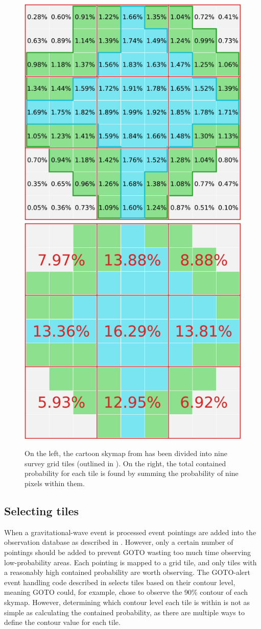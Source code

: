 \begin{colsection}
\begin{colsection}
\begin{figure}[t]
    \begin{center}
        \includegraphics[width=0.46\linewidth]{images/sim/sim_skymap_pix_probs.pdf}
        \includegraphics[width=0.46\linewidth]{images/sim/sim_skymap_tile_probs.pdf}
    \end{center}
    \caption[Mapping a 2D probability skymap onto grid tiles]{
        On the left, the cartoon skymap from  has been divided into nine survey grid tiles (outlined in ). On the right, the total contained probability for each tile is found by summing the probability of nine pixels within them.
    }\label{fig:sim_skymap_tiles}
\end{figure}

\end{colsection}


\newpage
\subsection{Selecting tiles}
\label{sec:selecting_tiles}
\begin{colsection}

When a gravitational-wave event is processed event pointings are added into the observation database as described in . However, only a certain number of pointings should be added to prevent GOTO wasting too much time observing low-probability areas. Each pointing is mapped to a grid tile, and only tiles with a reasonably high contained probability are worth observing. The GOTO-alert event handling code described in  selects tiles based on their contour level, meaning GOTO could, for example, chose to observe the 90\% contour of each skymap. However, determining which contour level each tile is within is not as simple as calculating the contained probability, as there are multiple ways to define the contour value for each tile.


\end{colsection}
\end{colsection}
